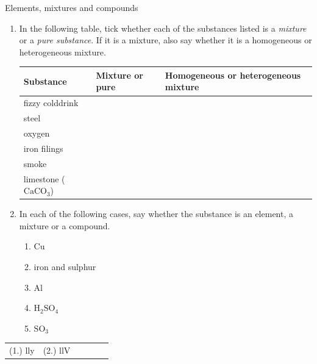             \begin{exercises}{Elements, mixtures and compounds}{
            \nopagebreak \noindent
            \label{m38708*id63472}
 \begin{enumerate}[noitemsep, label=\textbf{\arabic*}. ] 
    \item In the following table, tick whether each of the substances listed is a \textsl{mixture} or a \textsl{pure substance}. If it is a mixture, also say whether it is a homogeneous or heterogeneous mixture.
          \begin{table}[H]
        \begin{center}
    \noindent
      \begin{tabular}{|l|l|l|}\hline
        \textbf{Substance} &
        \textbf{Mixture or pure} &
        \textbf{Homogeneous or heterogeneous mixture} \\ \hline
        fizzy colddrink & & \\ \hline
        steel & & \\ \hline
        oxygen & & \\ \hline
        iron filings & & \\ \hline
        smoke & & \\ \hline
        limestone (${\text{CaCO}}_{3}$) & & \\ \hline
    \end{tabular}
      \end{center}
\end{table}

\label{m38708*uid29}\item In each of the following cases, say whether the substance is an element, a mixture or a compound.
\begin{enumerate}[noitemsep, label=\textbf{\alph*}. ] 
\item $\text{Cu}$
\item iron and sulphur
\item $\text{Al}$
\item $\text{H}_{2}\text{SO}_{4}$
\item $\text{SO}_{3}$
\end{enumerate}
                \end{enumerate}
\practiceinfo
\par 
 \par \begin{tabular}[h]{cccccc}
 (1.) lly  &  (2.) llV  & \end{tabular}
}
\end{exercises}
